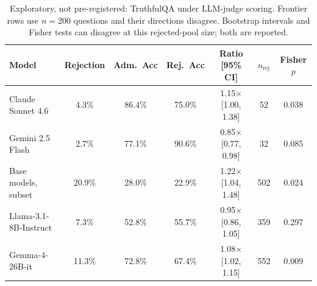 \begin{table}[h]
\centering
\footnotesize
\setlength{\tabcolsep}{4pt}
\begin{tabular}{lcccccc}
\toprule
Model & Rejection & Adm.\ Acc & Rej.\ Acc & Ratio [95\% CI] & $n_{\text{rej}}$ & Fisher $p$ \\
\midrule
Claude Sonnet 4.6 & 4.3\% & 86.4\% & 75.0\% & 1.15$\times$ [1.00, 1.38] & 52 & 0.038 \\
Gemini 2.5 Flash & 2.7\% & 77.1\% & 90.6\% & 0.85$\times$ [0.77, 0.98] & 32 & 0.085 \\
Base models, subset & 20.9\% & 28.0\% & 22.9\% & 1.22$\times$ [1.04, 1.48] & 502 & 0.024 \\
Llama-3.1-8B-Instruct & 7.3\% & 52.8\% & 55.7\% & 0.95$\times$ [0.86, 1.05] & 359 & 0.297 \\
Gemma-4-26B-it & 11.3\% & 72.8\% & 67.4\% & 1.08$\times$ [1.02, 1.15] & 552 & 0.009 \\
\bottomrule
\end{tabular}
\caption{Exploratory, not pre-registered: TruthfulQA under LLM-judge scoring. Frontier rows use $n=200$ questions and their directions disagree. Bootstrap intervals and Fisher tests can disagree at this rejected-pool size; both are reported.}
\label{tab:scope-exploratory}
\end{table}

